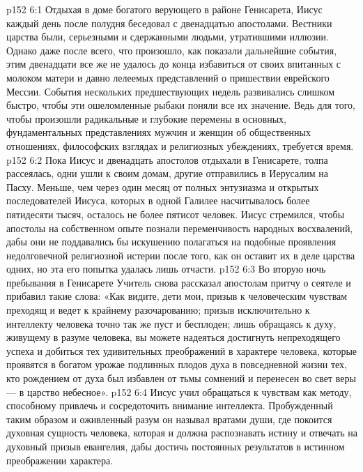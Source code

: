 \vs p152 6:1 Отдыхая в доме богатого верующего в районе Генисарета, Иисус каждый день после полудня беседовал с двенадцатью апостолами. Вестники царства были, серьезными и сдержанными людьми, утратившими иллюзии. Однако даже после всего, что произошло, как показали дальнейшие события, этим двенадцати все же не удалось до конца избавиться от своих впитанных с молоком матери и давно лелеемых представлений о пришествии еврейского Мессии. События нескольких предшествующих недель развивались слишком быстро, чтобы эти ошеломленные рыбаки поняли все их значение. Ведь для того, чтобы произошли радикальные и глубокие перемены в основных, фундаментальных представлениях мужчин и женщин об общественных отношениях, философских взглядах и религиозных убеждениях, требуется время.
\vs p152 6:2 Пока Иисус и двенадцать апостолов отдыхали в Генисарете, толпа рассеялась, одни ушли к своим домам, другие отправились в Иерусалим на Пасху. Меньше, чем через один месяц от полных энтузиазма и открытых последователей Иисуса, которых в одной Галилее насчитывалось более пятидесяти тысяч, осталось не более пятисот человек. Иисус стремился, чтобы апостолы на собственном опыте познали переменчивость народных восхвалений, дабы они не поддавались бы искушению полагаться на подобные проявления недолговечной религиозной истерии после того, как он оставит их в деле царства одних, но эта его попытка удалась лишь отчасти.
\vs p152 6:3 \pc Во вторую ночь пребывания в Генисарете Учитель снова рассказал апостолам притчу о сеятеле и прибавил такие слова: «Как видите, дети мои, призыв к человеческим чувствам преходящ и ведет к крайнему разочарованию; призыв исключительно к интеллекту человека точно так же пуст и бесплоден; лишь обращаясь к духу, живущему в разуме человека, вы можете надеяться достигнуть непреходящего успеха и добиться тех удивительных преображений в характере человека, которые проявятся в богатом урожае подлинных плодов духа в повседневной жизни тех, кто рождением от духа был избавлен от тьмы сомнений и перенесен во свет веры --- в царство небесное».
\vs p152 6:4 \pc Иисус учил обращаться к чувствам как методу, способному привлечь и сосредоточить внимание интеллекта. Пробужденный таким образом и оживленный разум он называл вратами души, где покоится духовная сущность человека, которая и должна распознавать истину и отвечать на духовный призыв евангелия, дабы достичь постоянных результатов в истинном преображении характера.

